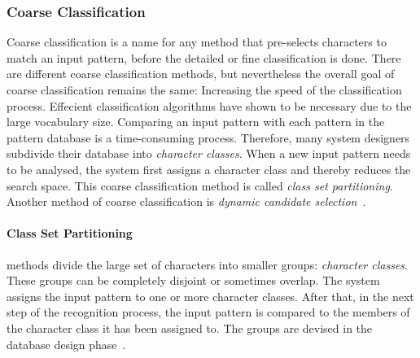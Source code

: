 \subsubsection{Coarse Classification}
\label{sec:olccr:coarseclassification}

Coarse classification is a name for any method that pre-selects characters
to match an input pattern, before the detailed or fine classification is done.
There are different coarse classification methods, but nevertheless the overall
goal of coarse classification remains the same: Increasing the speed of the
classification process.
Effecient classification algorithms have shown to be necessary due to the 
large vocabulary size. Comparing an input pattern with each pattern in the 
pattern database is a time-consuming process.
Therefore, many system designers subdivide their database into \emph{character
classes}. When a new input pattern needs to be analysed, the system first assigns
a character class and thereby reduces the search space. This coarse 
classification method is called \emph{class set partitioning}. Another method of 
coarse classification is \emph{dynamic candidate 
selection}~.

\paragraph{Class Set Partitioning} methods divide the large set of characters  
into smaller groups: \emph{character classes}. These groups can be 
completely disjoint or sometimes overlap. The system assigns the input pattern 
to one or more character classes. After that, in the next step of the 
recognition process, the input pattern is compared to the members of 
the character class it has been assigned to. The groups are devised in the 
database design phase~.


